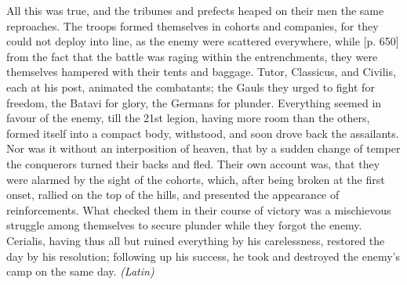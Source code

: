 All this was true, and the tribunes and prefects heaped on their men the same reproaches. The troops formed themselves in cohorts and companies, for they could not deploy into line, as the enemy were scattered everywhere, while [p. 650] from the fact that the battle was raging within the entrenchments, they were themselves hampered with their tents and baggage. Tutor, Classicus, and Civilis, each at his post, animated the combatants; the Gauls they urged to fight for freedom, the Batavi for glory, the Germans for plunder. Everything seemed in favour of the enemy, till the 21st legion, having more room than the others, formed itself into a compact body, withstood, and soon drove back the assailants. Nor was it without an interposition of heaven, that by a sudden change of temper the conquerors turned their backs and fled. Their own account was, that they were alarmed by the sight of the cohorts, which, after being broken at the first onset, rallied on the top of the hills, and presented the appearance of reinforcements. What checked them in their course of victory was a mischievous struggle among themselves to secure plunder while they forgot the enemy. Cerialis, having thus all but ruined everything by his carelessness, restored the day by his resolution; following up his success, he took and destroyed the enemy's camp on the same day. \emph{(Latin)}


